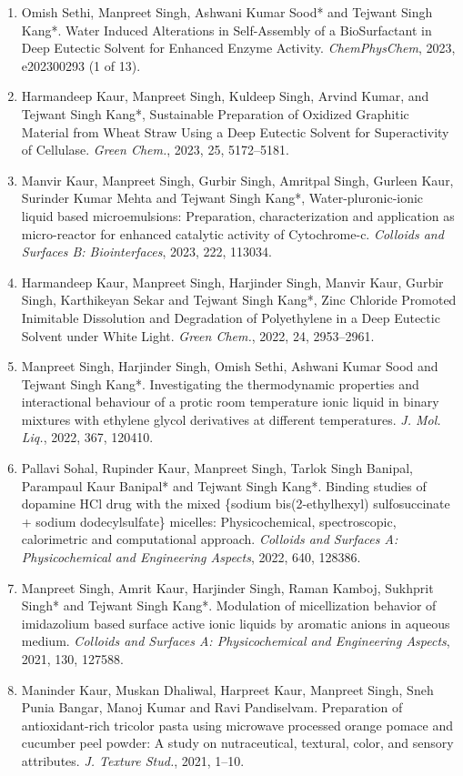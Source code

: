 \documentclass[11pt,a4paper]{article}
\begin{document}
\begin{enumerate}[leftmargin=*,label=\arabic*.,itemsep=5pt]
\item Omish Sethi, Manpreet Singh, Ashwani Kumar Sood* and Tejwant Singh Kang*. Water Induced Alterations in Self-Assembly of a BioSurfactant in Deep Eutectic Solvent for Enhanced Enzyme Activity. \textit{ChemPhysChem}, 2023, e202300293 (1 of 13).
\item Harmandeep Kaur, Manpreet Singh, Kuldeep Singh, Arvind Kumar, and Tejwant Singh Kang*, Sustainable Preparation of Oxidized Graphitic Material from Wheat Straw Using a Deep Eutectic Solvent for Superactivity of Cellulase. \textit{Green Chem.}, 2023, 25, 5172--5181.
\item Manvir Kaur, Manpreet Singh, Gurbir Singh, Amritpal Singh, Gurleen Kaur, Surinder Kumar Mehta and Tejwant Singh Kang*, Water-pluronic-ionic liquid based microemulsions: Preparation, characterization and application as micro-reactor for enhanced catalytic activity of Cytochrome-c. \textit{Colloids and Surfaces B: Biointerfaces}, 2023, 222, 113034.
\item Harmandeep Kaur, Manpreet Singh, Harjinder Singh, Manvir Kaur, Gurbir Singh, Karthikeyan Sekar and Tejwant Singh Kang*, Zinc Chloride Promoted Inimitable Dissolution and Degradation of Polyethylene in a Deep Eutectic Solvent under White Light. \textit{Green Chem.}, 2022, 24, 2953--2961.
\item Manpreet Singh, Harjinder Singh, Omish Sethi, Ashwani Kumar Sood and Tejwant Singh Kang*. Investigating the thermodynamic properties and interactional behaviour of a protic room temperature ionic liquid in binary mixtures with ethylene glycol derivatives at different temperatures. \textit{J. Mol. Liq.}, 2022, 367, 120410.
\item Pallavi Sohal, Rupinder Kaur, Manpreet Singh, Tarlok Singh Banipal, Parampaul Kaur Banipal* and Tejwant Singh Kang*. Binding studies of dopamine HCl drug with the mixed \{sodium bis(2-ethylhexyl) sulfosuccinate + sodium dodecylsulfate\} micelles: Physicochemical, spectroscopic, calorimetric and computational approach. \textit{Colloids and Surfaces A: Physicochemical and Engineering Aspects}, 2022, 640, 128386.
\item Manpreet Singh, Amrit Kaur, Harjinder Singh, Raman Kamboj, Sukhprit Singh* and Tejwant Singh Kang*. Modulation of micellization behavior of imidazolium based surface active ionic liquids by aromatic anions in aqueous medium. \textit{Colloids and Surfaces A: Physicochemical and Engineering Aspects}, 2021, 130, 127588.
\item Maninder Kaur, Muskan Dhaliwal, Harpreet Kaur, Manpreet Singh, Sneh Punia Bangar, Manoj Kumar and Ravi Pandiselvam. Preparation of antioxidant-rich tricolor pasta using microwave processed orange pomace and cucumber peel powder: A study on nutraceutical, textural, color, and sensory attributes. \textit{J. Texture Stud.}, 2021, 1--10.

\end{enumerate}
\end{document}
